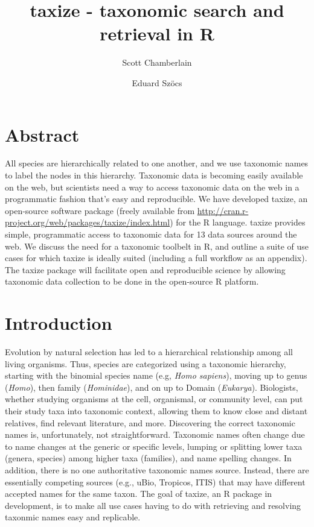 \documentclass[letterpaper,superscriptaddress,showkeys,longbibliography,10pt]{revtex4-1}\usepackage{graphicx, color}
\begin{document}
\title{taxize - taxonomic search and retrieval in R}

\author{Scott Chamberlain}

\author{Eduard Sz\"{o}cs}

\maketitle

\section{Abstract}

All species are hierarchically related to one another, and we use taxonomic names to label the nodes in this hierarchy. Taxonomic data is becoming easily available on the web, but scientists need a way to access taxonomic data on the web in a programmatic fashion that's easy and reproducible. We have developed taxize, an open-source software package (freely available from \url{http://cran.r-project.org/web/packages/taxize/index.html}) for the R language. taxize provides simple, programmatic access to taxonomic data for 13 data sources around the web. We discuss the need for a taxonomic toolbelt in R, and outline a suite of use cases for which taxize is ideally suited (including a full workflow as an appendix). The taxize package will facilitate open and reproducible science by allowing taxonomic data collection to be done in the open-source R platform.

\section{Introduction}

Evolution by natural selection has led to a hierarchical relationship among all living organisms.  Thus, species are categorized using a taxonomic hierarchy, starting with the binomial species name (e.g, \emph{Homo sapiens}), moving up to genus (\emph{Homo}), then family (\emph{Hominidae}), and on up to Domain (\emph{Eukarya}). Biologists, whether studying organisms at the cell, organismal, or community level, can put their study taxa into taxonomic context, allowing them to know close and distant relatives, find relevant literature, and more. Discovering the correct taxonomic names is, unfortunately, not straightforward. Taxonomic names often change due to name changes at the generic or specific levels, lumping or splitting lower taxa (genera, species) among higher taxa (families), and name spelling changes. In addition, there is no one authoritative taxonomic names source. Instead, there are essentially competing sources (e.g., uBio, Tropicos, ITIS) that may have different accepted names for the same taxon. The goal of taxize, an R package in development, is to make all use cases having to do with retrieving and resolving taxonmic names easy and replicable. 
\end{document}
